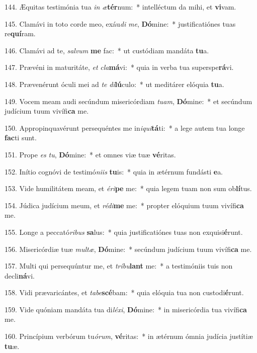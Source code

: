 144. Æquitas testimónia tua \textit{in} \textit{æ}\textbf{tér}num:~*  intelléctum da mihi, et \textbf{vi}vam.\

145. Clamávi in toto corde meo, exáu\textit{di} \textit{me}, \textbf{Dó}mine:~*  justificatiónes tuas re\textbf{quí}ram.\

146. Clamávi ad te, \textit{sal}\textit{vum} \textbf{me} fac:~*  ut custódiam mandáta \textbf{tu}a.\

147. Prævéni in maturitáte, \textit{et} \textit{cla}\textbf{má}vi:~*  quia in verba tua superspe\textbf{rá}vi.\

148. Prævenérunt óculi mei ad \textit{te} \textit{di}\textbf{lú}culo:~*  ut meditárer elóquia \textbf{tu}a.\

149. Vocem meam audi secúndum misericórdiam \textit{tu}\textit{am}, \textbf{Dó}mine:~*  et secúndum judícium tuum vivífi\textbf{ca} me.\

150. Appropinquavérunt persequéntes me in\textit{i}\textit{qui}\textbf{tá}ti:~*  a lege autem tua longe \textbf{fac}ti sunt.\

151. Prope \textit{es} \textit{tu}, \textbf{Dó}mine:~*  et omnes viæ tuæ \textbf{vé}ritas.\

152. Inítio cognóvi de testimó\textit{ni}\textit{is} \textbf{tu}is:~*  quia in ætérnum fundásti \textbf{e}a.\

153. Vide humilitátem meam, et \textit{é}\textit{ri}\textbf{pe} me:~*  quia legem tuam non sum ob\textbf{lí}tus.\

154. Júdica judícium meum, et \textit{réd}\textit{i}\textbf{me} me:~*  propter elóquium tuum vivífi\textbf{ca} me.\

155. Longe a peccató\textit{ri}\textit{bus} \textbf{sa}lus:~*  quia justificatiónes tuas non exquisi\textbf{é}runt.\

156. Misericórdiæ tuæ \textit{mul}\textit{tæ}, \textbf{Dó}mine:~*  secúndum judícium tuum vivífi\textbf{ca} me.\

157. Multi qui persequúntur me, et \textit{trí}\textit{bu}\textbf{lant} me:~*  a testimóniis tuis non decli\textbf{ná}vi.\

158. Vidi prævaricántes, et \textit{ta}\textit{be}\textbf{scé}bam:~*  quia elóquia tua non custodi\textbf{é}runt.\

159. Vide quóniam mandáta tua di\textit{lé}\textit{xi}, \textbf{Dó}mine:~*  in misericórdia tua vivífi\textbf{ca} me.\

160. Princípium verbórum tu\textit{ó}\textit{rum}, \textbf{vé}ritas:~*  in ætérnum ómnia judícia justítiæ \textbf{tu}æ.\

